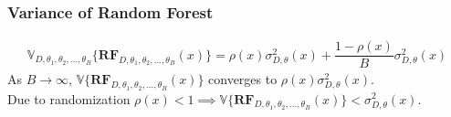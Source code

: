 \begin{frame}
    \frametitle{Variance of Random Forest}
    \begin{align}
        \mathbb{V}_{D, \theta_{1}, \theta_{2},..., \theta_{B}}\{\boldsymbol{RF}_{D, \theta_{1},\theta_{2},..., \theta_{B}}(x) \}  = \rho(x)\sigma^2_{D,\theta}(x) + \dfrac{1-\rho(x)}{B}\sigma^2_{D,\theta}(x)
    \end{align}
    \bigbreak
    \quad As $B \rightarrow \infty$, $\mathbb{V}\{\boldsymbol{RF}_{D, \theta_{1},\theta_{2},..., \theta_{B}}(x) \}$ converges to $\rho(x)\sigma^2_{D,\theta}(x)$.\\
    \bigbreak
    \quad Due to randomization $\rho(x) < 1 \implies \mathbb{V}\{\boldsymbol{RF}_{D, \theta_{1},\theta_{2},..., \theta_{B}}(x) \}< \sigma^2_{D,\theta}(x)$.
\end{frame}